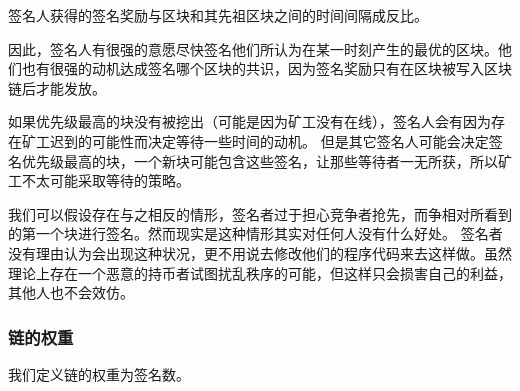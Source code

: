 \documentclass[letterpaper]{article}
\begin{document}
签名人获得的签名奖励与区块和其先祖区块之间的时间间隔成反比。

因此，签名人有很强的意愿尽快签名他们所认为在某一时刻产生的最优的区块。他们也有很强的动机达成签名哪个区块的共识，因为签名奖励只有在区块被写入区块链后才能发放。

如果优先级最高的块没有被挖出（可能是因为矿工没有在线），签名人会有因为存在矿工迟到的可能性而决定等待一些时间的动机。
但是其它签名人可能会决定签名优先级最高的块，一个新块可能包含这些签名，让那些等待者一无所获，所以矿工不太可能采取等待的策略。

我们可以假设存在与之相反的情形，签名者过于担心竞争者抢先，而争相对所看到的第一个块进行签名。然而现实是这种情形其实对任何人没有什么好处。
签名者没有理由认为会出现这种状况，更不用说去修改他们的程序代码来去这样做。虽然理论上存在一个恶意的持币者试图扰乱秩序的可能，但这样只会损害自己的利益，其他人也不会效仿。

\subsubsection{链的权重}

我们定义链的权重为签名数。
\end{document}
